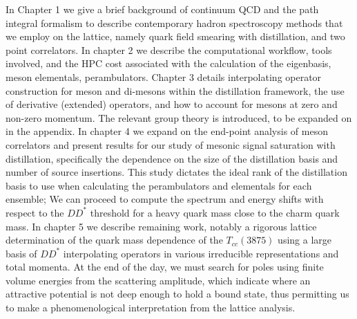 In Chapter 1 we give a brief background of continuum QCD and the path integral formalism to describe contemporary hadron spectroscopy methods that we employ on the lattice, namely quark field smearing with distillation, and two point correlators. In chapter 2 we describe the computational workflow, tools involved, and the HPC cost associated with the calculation of the eigenbasis, meson elementals, perambulators. Chapter 3 details interpolating operator construction for meson and di-mesons within the distillation framework, the use of derivative (extended) operators, and how to account for mesons at zero and non-zero momentum. The relevant group theory is introduced, to be expanded on in the appendix. In chapter 4 we expand on the end-point analysis of meson correlators and present results for our study of mesonic signal saturation with distillation, specifically the dependence on the size of the distillation basis and number of source insertions. This study dictates the ideal rank of the distillation basis to use when calculating the perambulators and elementals for each ensemble; We can proceed to compute the spectrum and energy shifts with respect to the $DD^*$ threshold for a heavy quark mass close to the charm quark mass.  In chapter 5 we describe remaining work, notably a rigorous lattice determination of the quark mass dependence of the $T_{cc}(3875)$ using a large basis of $DD^*$ interpolating operators in various irreducible representations and total momenta. At the end of the day, we must search for poles using finite volume energies from the scattering amplitude, which indicate where an attractive potential is not deep enough to hold a bound state, thus permitting us to make a phenomenological interpretation from the lattice analysis. 